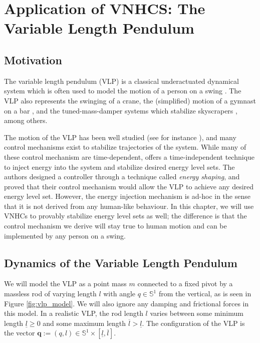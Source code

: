 
\chapter{Application of VNHCS: The Variable Length Pendulum}\label{sec:vlp}
\section{Motivation}
The variable length pendulum (VLP) is a classical underactuated dynamical system
which is often used to model the motion of a person on a swing
\cite{pumping_swing_standing_squatting,how_to_pump_a_swing}.
The VLP also represents the swinging of a crane, the (simplified) motion of a
gymnast on a bar \cite{pendulum_length_giant_gymnastics}, and the
tuned-mass-damper systems which stabilize skyscrapers
\cite{vlp_tuned_mass_damper}, among others.

The motion of the VLP has been well studied (see for instance
\cite{dynamics_periodic_vlp}), and many control mechanisms exist
to stabilize trajectories of the system. While many of these control mechanism
are time-dependent, \cite{vlp_energy_shaping}
offers a time-independent technique to inject energy into the system and
stabilize desired energy level sets. The authors designed a controller through a
technique called \textit{energy shaping}, and proved that their control
mechanism would allow the VLP to achieve any desired energy level set.
However, the energy injection mechanism is
ad-hoc in the sense that it is not derived from any human-like behaviour. In
this chapter, we will use VNHCs to provably stabilize energy level sets as well;
the difference is that the control mechanism we derive will stay true to human
motion and can be implemented by any person on a swing.

\section{Dynamics of the Variable Length Pendulum}
We will model the VLP as a point mass \(m\)
connected to a fixed pivot by a massless rod of varying length \(l\) with angle 
\(q \in \mathbb{S}^1\) from the vertical, as is seen in Figure
\ref{fig:vlp_model}. 
We will also ignore any damping and frictional forces in this model.
In a realistic VLP, the rod length \(l\) varies between some minimum
length \(\underline{l} \geq 0\) and some maximum length 
\(\overline{l} > \underline{l}\). The configuration of the VLP is the vector
\(\mathbf{q} := (q,l) \in \mathbb{S}^1 \times [\underline{l},\overline{l}]\).

